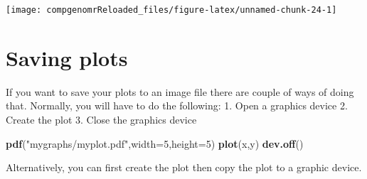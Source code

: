 \documentclass[12pt,]{krantz}
\newenvironment{Shaded}{\begin{snugshade}}{\end{snugshade}}
\newcommand{\DataTypeTok}[1]{\textcolor[rgb]{0.13,0.29,0.53}{#1}}
\newcommand{\DecValTok}[1]{\textcolor[rgb]{0.00,0.00,0.81}{#1}}
\newcommand{\KeywordTok}[1]{\textcolor[rgb]{0.13,0.29,0.53}{\textbf{#1}}}
\newcommand{\NormalTok}[1]{#1}
\newcommand{\StringTok}[1]{\textcolor[rgb]{0.31,0.60,0.02}{#1}}
\theoremstyle{definition}
\theoremstyle{definition}
\theoremstyle{definition}
\theoremstyle{remark}
\begin{document}
\begin{Shaded}
\end{Shaded}

\begin{center}\texttt{[image: compgenomrReloaded\_files/figure-latex/unnamed-chunk-24-1]} \end{center}

\hypertarget{saving-plots}{%
\section{Saving plots}\label{saving-plots}}

If you want to save your plots to an image file there are couple of ways
of doing that. Normally, you will have to do the following: 1. Open a
graphics device 2. Create the plot 3. Close the graphics device

\begin{Shaded}
\begin{Highlighting}[]
\KeywordTok{pdf}\NormalTok{(}\StringTok{"mygraphs/myplot.pdf"}\NormalTok{,}\DataTypeTok{width=}\DecValTok{5}\NormalTok{,}\DataTypeTok{height=}\DecValTok{5}\NormalTok{)}
\KeywordTok{plot}\NormalTok{(x,y)}
\KeywordTok{dev.off}\NormalTok{()}
\end{Highlighting}
\end{Shaded}

Alternatively, you can first create the plot then copy the plot to a
graphic device.
\end{document}
